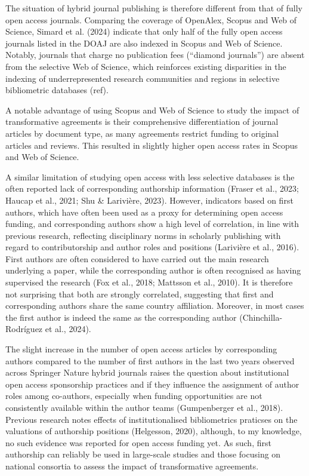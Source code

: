 \documentclass[a4paper,man,floatsintext,longtable,noextraspace,10pt]{apa6}
\begin{document}
The situation of hybrid journal publishing is therefore different from
that of fully open access journals. Comparing the coverage of OpenAlex,
Scopus and Web of Science, Simard et al. (2024) indicate that only half
of the fully open access journals listed in the DOAJ are also indexed in
Scopus and Web of Science. Notably, journals that charge no publication
fees (``diamond journals'') are absent from the selective Web of
Science, which reinforces existing disparities in the indexing of
underrepresented research communities and regions in selective
bibliometric databases (ref).

A notable advantage of using Scopus and Web of Science to study the
impact of transformative agreements is their comprehensive
differentiation of journal articles by document type, as many agreements
restrict funding to original articles and reviews. This resulted in
slightly higher open access rates in Scopus and Web of Science.

A similar limitation of studying open access with less selective
databases is the often reported lack of corresponding authorship
information (Fraser et al., 2023; Haucap et al., 2021; Shu \& Larivière,
2023). However, indicators based on first authors, which have often been
used as a proxy for determining open access funding, and corresponding
authors show a high level of correlation, in line with previous
research, reflecting disciplinary norms in scholarly publishing with
regard to contributorship and author roles and positions (Larivière et
al., 2016). First authors are often considered to have carried out the
main research underlying a paper, while the corresponding author is
often recognised as having supervised the research (Fox et al., 2018;
Mattsson et al., 2010). It is therefore not surprising that both are
strongly correlated, suggesting that first and corresponding authors
share the same country affiliation. Moreover, in most cases the first
author is indeed the same as the corresponding author
(Chinchilla-Rodríguez et al., 2024).

The slight increase in the number of open access articles by
corresponding authors compared to the number of first authors in the
last two years observed across Springer Nature hybrid journals raises
the question about institutional open access sponsorship practices and
if they influence the assignment of author roles among co-authors,
especially when funding opportunities are not consistently available
within the author teams (Gumpenberger et al., 2018). Previous research
notes effects of institutionalised bibliometrics praticses on the
valuations of authorship positions (Helgesson, 2020), although, to my
knowledge, no such evidence was reported for open access funding yet. As
such, first authorship can reliably be used in large-scale studies and
those focusing on national consortia to assess the impact of
transformative agreements.
\end{document}
